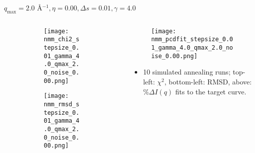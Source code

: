 \documentclass{beamer}
\begin{document}
\begin{frame}{$ q_{\textrm{max}}=2.0 $ \AA $^{-1}, \eta=0.00, \Delta s=0.01, \gamma=4.0$}
	\begin{columns}
		\begin{column}{.5\textwidth}
			\begin{figure}[H]
			\centering
			\begin{subfigure}[b]{\textwidth}
				\centering
				\texttt{[image: nmm\_chi2\_stepsize\_0.01\_gamma\_4.0\_qmax\_2.0\_noise\_0.00.png]}
				\label{fig:}
			\end{subfigure}
			\begin{subfigure}[b]{\textwidth}
				\centering
				\texttt{[image: nmm\_rmsd\_stepsize\_0.01\_gamma\_4.0\_qmax\_2.0\_noise\_0.00.png]}
				\label{fig:}
			\end{subfigure}
			\end{figure}
		\end{column}
		\begin{column}{.5\textwidth}
			\begin{figure}[H]
				\centering
				\texttt{[image: nmm\_pcdfit\_stepsize\_0.01\_gamma\_4.0\_qmax\_2.0\_noise\_0.00.png]}
				\label{fig:}
			\end{figure}
			\begin{itemize}
				\item 10 simulated annealing runs; top-left: $\chi^2$, bottom-left: RMSD, above: $\%\Delta I(q)$ fits to the target curve.
			\end{itemize}
		\end{column}
	\end{columns}
\end{frame}
 
\end{document}
